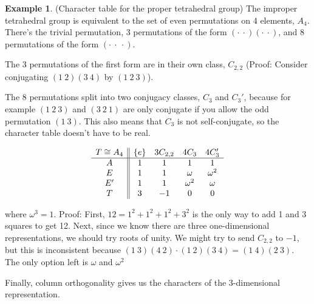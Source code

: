 \documentclass[12pt, letterpaper]{article}
\theoremstyle{definition} %
\newtheorem{ex}[thm]{Example}
\begin{document}
\begin{ex}
  (Character table for the proper tetrahedral group)
  The improper tetrahedral group is equivalent to the set of even permutations on 4 elements, $A_4$. 
  There's the trivial permutation, 3 permutations of the form $(\cdot\ \cdot)(\cdot\ \cdot)$, 
  and 8 permutations of the form $(\cdot\ \cdot\ \cdot)$.

  The 3 permutations of the first form are in their own class, $C_{2,2}$ (Proof: Consider conjugating $(1\ 2)(3\ 4)$ by $(1\ 2\ 3)$).

  The 8 permutations split into two conjugacy classes, $C_3$ and $C_3'$, because for example $(1\ 2\ 3)$ and $(3\ 2\ 1)$ are only conjugate if you allow the
  odd permutation $(1\ 3)$. This also means that $C_3$ is not self-conjugate, so the character table doesn't have to be real.

\begin{equation*}
 \begin{array}{c || c c c c} 
   T\cong A_4 & \{e\} & 3C_{2,2} & 4C_3 & 4C_3'   \\ 
 \hline
 A & 1 & 1 & 1 & 1  \\ 
 E & 1 & 1 & \omega & \omega^2  \\ 
 E' & 1 & 1 & \omega^2 & \omega  \\ 
 T & 3 & -1 & 0 & 0 
\end{array}
\end{equation*}

where $\omega^3=1$. Proof: First, $12=1^2+1^2+1^2+3^2$ is the only way to add 1 and 3 squares to get 12. 
Next, since we know there are three one-dimensional 
representations, we should try roots of unity. We might try to send $C_{2,2}$ to $-1$, but this is inconsistent because 
$(1\ 3)(4\ 2)\cdot(1\ 2)(3\ 4)=(1\ 4)(2\ 3)$. The only option left is $\omega$ and $\omega^2$ 

Finally, column orthogonality gives us the characters of the 3-dimensional representation.
\end{ex}
\end{document}
